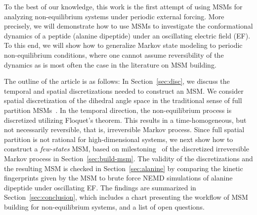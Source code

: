 \documentclass[journal=jctcce,manuscript=article]{achemso}
\begin{document}
To the best of our knowledge, this work is the first attempt of using MSMs for analyzing non-equilibrium systems under periodic external forcing.
More precisely, we will demonstrate how to use MSMs to investigate the conformational dynamics of a peptide (alanine dipeptide) under an oscillating electric field (EF).
To this end, we will show how to generalize Markov state modeling to periodic non-equilibrium conditions, where one cannot assume reversibility of the dynamics as is most often the case in the literature on MSM building. 

The outline of the article is as follows: 
In Section~\ref{sec:disc}, we discuss the temporal and spatial
discretizations needed to construct an MSM. We consider spatial discretization
of the dihedral angle space in the traditional sense of full partition MSMs~\cite{pande2010everything,A19-29}.
In the temporal direction, the non-equilibrium process
is discretized utilizing Floquet's theorem. This results in a time-homogeneous, 
but not necessarily reversible, that is, irreversible Markov process. Since  full spatial partition is not rational
for high-dimensional systems, we next show how to construct a \emph{few-states} MSM, based on milestoning~\cite{schuette2011markov,A19-29} of the discretized irreversible Markov process in Section~\ref{sec:build-msm}.
The validity of the discretizations and the resulting MSM is checked in Section~\ref{sec:alanine}
by comparing the kinetic fingerprints given by the MSM to brute force
NEMD simulations of alanine dipeptide under oscillating EF.
The findings are summarized in Section~\ref{sec:conclusion}, which includes a chart presenting
the workflow of MSM building for non-equilibrium systems, and a list of open questions.



\end{document}
